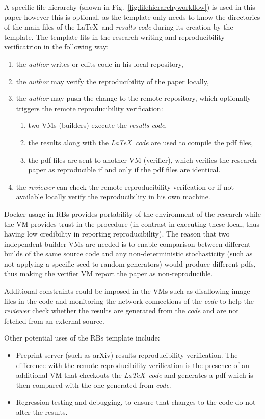\documentclass[journal]{IEEEtran}
\begin{document}
A specific file hierarchy (shown in Fig.~\ref{fig:filehierarchyworkflow}) is used in this paper however this is optional, as the template only needs to know the directories of the main files of the \LaTeX\ and \textit{results code} during its creation by the template.
The template fits in the research writing and reproducibility verificatrion in the following way:
\begin{enumerate}
	\item the \textit{author} writes or edits code in his local repository,
	\item the \textit{author} may verify the reproducibility of the paper locally,
	\item the \textit{author} may push the change to the remote repository, which optionally triggers the remote reproducibility verification:
		\begin{enumerate}
			\item two VMs (builders) execute the \textit{results code},
			\item the results along with the \textit{\LaTeX\ code} are used to compile the pdf files,
			\item the pdf files are sent to another VM (verifier), which verifies the research paper as reproducible if and only if the pdf files are identical.
		\end{enumerate}
	\item the \textit{reviewer} can check the remote reproducibility verifcation or if not available locally verify the reproducibility in his own machine.
\end{enumerate}

Docker usage in RBs provides portability of the environment of the research while the VM provides trust in the procedure (in contrast in executing these local, thus having low credibility in reporting reproducibility).
The reason that two independent builder VMs are needed is to enable comparison between different builds of the same source code and any non-deterministic stochasticity (such as not applying a specific seed to random generators) would produce different pdfs, thus making the verifier VM report the paper as non-reproducible.

Additional constraints could be imposed in the VMs such as disallowing image files in the code and monitoring the network connections of the \textit{code} to help the \textit{reviewer} check whether the results are generated from the \textit{code} and are not fetched from an external source.

Other potential uses of the RBs template include:
\begin{itemize}
	\item Preprint server (such as arXiv) results reproducibility verification.
		The difference with the remote reproducibility verification is the presence of an additional VM that checkouts the \textit{\LaTeX\ code} and generates a pdf which is then compared with the one generated from \textit{code}.
	\item Regression testing and debugging, to ensure that changes to the code do not alter the results.
\end{itemize}
\end{document}
